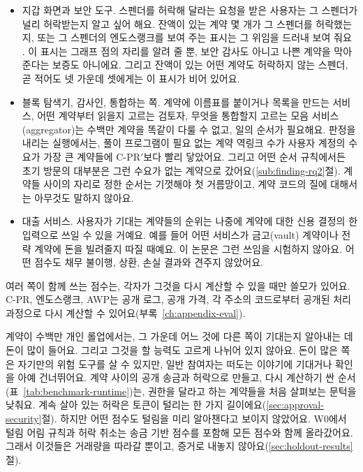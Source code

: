 \begin{itemize}
\item 지갑 화면과 보안 도구. 스펜더를 허락해 달라는 요청을 받은 사용자는 그 스펜더가 널리 허락받는지 알고 싶어 해요. 잔액이 있는 계약 몇 개가 그 스펜더를 허락했는지, 또는 그 스펜더의 엔도스랭크를 보여 주는 표시는 그 위임을 드러내 보여 줘요 \parencite{vogelsteller2015erc20,lundfall2020permit}. 이 표시는 그래프 점의 자리를 알려 줄 뿐, 보안 감사도 아니고 나쁜 계약을 막아 준다는 보증도 아니에요. 그리고 잔액이 있는 어떤 계약도 허락하지 않는 스펜더, 곧 적어도 넷 가운데 셋에게는 이 표시가 비어 있어요.
\item 블록 탐색기, 감사인, 통합하는 쪽. 계약에 이름표를 붙이거나 목록을 만드는 서비스, 어떤 계약부터 읽을지 고르는 검토자, 무엇을 통합할지 고르는 모음 서비스(aggregator)는 수백만 계약을 똑같이 다룰 수 없고, 일의 순서가 필요해요. 판정을 내리는 실행에서는, 풀이 프로그램이 필요 없는 계약 역링크 수가 사용자 계정의 수요가 가장 큰 계약들에 \mbox{C-PR}$'$보다 빨리 닿았어요. 그리고 어떤 순서 규칙에서든 초기 방문의 대부분은 그런 수요가 없는 계약으로 갔어요(\ref{sub:finding-rq2}절). 계약들 사이의 자리로 정한 순서는 기껏해야 첫 거름망이고, 계약 코드의 질에 대해서는 아무것도 말하지 않아요.
\item 대출 서비스. 사용자가 기대는 계약들의 순위는 나중에 계약에 대한 신용 결정의 한 입력으로 쓰일 수 있을 거예요. 예를 들어 어떤 서비스가 금고(vault) 계약이나 전략 계약에 돈을 빌려줄지 따질 때예요. 이 논문은 그런 쓰임을 시험하지 않아요. 어떤 점수도 채무 불이행, 상환, 손실 결과와 견주지 않았어요.
\end{itemize}


여러 쪽이 함께 쓰는 점수는, 각자가 그것을 다시 계산할 수 있을 때만 쓸모가 있어요. \mbox{C-PR}, 엔도스랭크, AWP는 공개 로그, 공개 가격, 각 주소의 코드로부터 공개된 처리 과정으로 다시 계산할 수 있어요(부록~\ref{ch:appendix-eval}).


계약이 수백만 개인 롤업에서는, 그 가운데 어느 것에 다른 쪽이 기대는지 알아내는 데 돈이 많이 들어요. 그리고 그것을 할 능력도 고르게 나뉘어 있지 않아요. 돈이 많은 쪽은 자기만의 위험 도구를 살 수 있지만, 일반 참여자는 떠도는 이야기에 기대거나 확인을 아예 건너뛰어요. 계약 사이의 공개 송금과 허락으로 만들고, 다시 계산하기 싼 순서(표~\ref{tab:benchmark-runtime})는, 권한을 달라고 하는 계약들을 처음 살펴보는 문턱을 낮춰요. 계속 살아 있는 허락은 토큰이 털리는 한 가지 길이에요(\ref{sec:approval-security}절). 하지만 어떤 점수도 털림을 미리 알아챈다고 보이지 않았어요. W0에서 털림 어림 규칙과 허락 취소는 송금 기반 점수를 포함해 모든 점수와 함께 올라갔어요. 그래서 이것들은 거래량을 따라갈 뿐이고, 증거로 내놓지 않아요(\ref{sec:holdout-results}절).

